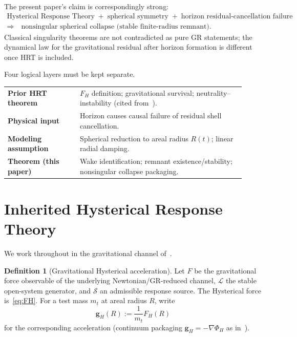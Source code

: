 \documentclass[11pt]{article}
\theoremstyle{definition}
\newtheorem{definition}[theorem]{Definition}
\theoremstyle{remark}
\newcommand{\FH}{F_H}
\begin{document}
The present paper's claim is correspondingly strong:
\begin{equation}
\label{eq:claim}
\boxed{\begin{gathered}
\text{Hysterical Response Theory}
\;+\;
\text{spherical symmetry}
\;+\;
\text{horizon residual-cancellation failure}\\
\Longrightarrow\quad
\text{nonsingular spherical collapse (stable finite-radius remnant).}
\end{gathered}}
\end{equation}
Classical singularity theorems are not contradicted as pure GR statements; the dynamical
law for the gravitational residual after horizon formation is different once HRT is
included.

Four logical layers must be kept separate.
\begin{center}
\begin{tabular}{@{}>{\bfseries}p{0.28\linewidth}p{0.64\linewidth}@{}}
\toprule
Prior HRT theorem & $\FH$ definition; gravitational survival; neutrality--instability
(cited from~\cite{boyd2026response}).\\
Physical input & Horizon causes causal failure of residual shell cancellation.\\
Modeling assumption & Spherical reduction to areal radius $R(t)$; linear radial damping.\\
Theorem (this paper) & Wake identification; remnant existence/stability; nonsingular
collapse packaging.\\
\bottomrule
\end{tabular}
\end{center}

\section{Inherited Hysterical Response Theory}
\label{sec:hrt}
We work throughout in the gravitational channel of~\cite{boyd2026response}.

\begin{definition}[Gravitational Hysterical acceleration]
\label{def:gH}
Let $F$ be the gravitational force observable of the underlying Newtonian/GR-reduced
channel, $\mathcal L$ the stable open-system generator, and $\mathcal S$ an admissible
response source.
The Hysterical force is~\eqref{eq:FH}.
For a test mass $m_t$ at areal radius $R$, write
\begin{equation}
\label{eq:gH}
\mathbf g_H(R):=\frac{1}{m_t}\FH(R)
\end{equation}
for the corresponding acceleration (continuum packaging $\mathbf g_H=-\nabla\Phi_H$ as
in~\cite{boyd2026response}).
\end{definition}
\end{document}
